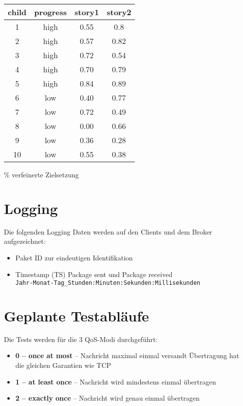 \documentclass[]{article}
\begin{document}
\begin{table}[htbp]
  \centering
  \caption{}
    \begin{tabular}{cccc}
    child & progress & story1 & story2 \\ \hline
    1     & high  & 0.55  & 0.8 \\
    2     & high  & 0.57  & 0.82 \\
    3     & high  & 0.72  & 0.54 \\
    4     & high  & 0.70  & 0.79 \\
    5     & high  & 0.84  & 0.89 \\
    6     & low   & 0.40  & 0.77 \\
    7     & low   & 0.72  & 0.49 \\
    8     & low   & 0.00  & 0.66 \\
    9     & low   & 0.36  & 0.28 \\
    10    & low   & 0.55  & 0.38 \\
    \end{tabular}%
  \label{tab:addlabel}%
\end{table}

\% verfeinerte Zielsetzung \section{Logging}

Die folgenden Logging Daten werden auf den Clients und dem Broker
aufgezeichnet:

\begin{itemize}
    \item Paket ID zur eindeutigen Identifikation
    \item Timestamp (TS) Package sent und Package received \\
    \texttt{Jahr-Monat-Tag\_Stunden:Minuten:Sekunden:Millisekunden}
\end{itemize}

\section{Geplante Testabläufe}

Die Tests werden für die 3 QoS-Modi durchgeführt:

\begin{itemize}
\item  \textbf{0 – once at most} – Nachricht maximal einmal versandt Übertragung hat die gleichen Garantien wie TCP
\item  \textbf{1 – at least once} – Nachricht wird mindestens einmal übertragen
\item  \textbf{2 – exactly once} – Nachricht wird genau einmal übertragen
\end{itemize}
\end{document}
